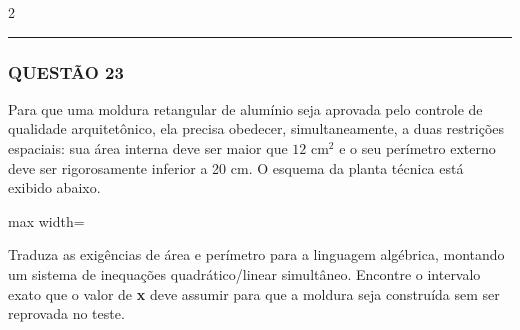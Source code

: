 \documentclass[11pt, a4paper]{article}
\begin{document}
\begin{multicols*}{2}
\vspace{0cm} \noindent\textcolor{CorLinha}{\rule{\linewidth}{0.5pt}} \vspace{-0.2cm}
\subsubsection*{QUESTÃO 23}
Para que uma moldura retangular de alumínio seja aprovada pelo controle de qualidade arquitetônico, ela precisa obedecer, simultaneamente, a duas restrições espaciais: sua área interna deve ser maior que $ 12 \text{ cm}^2 $ e o seu perímetro externo deve ser rigorosamente inferior a 20 cm. O esquema da planta técnica está exibido abaixo.

\begin{center}
\begin{adjustbox}{max width=\linewidth}
\end{adjustbox}
\end{center}

Traduza as exigências de área e perímetro para a linguagem algébrica, montando um sistema de inequações quadrático/linear simultâneo. Encontre o intervalo exato que o valor de \textbf{x} deve assumir para que a moldura seja construída sem ser reprovada no teste.


\end{multicols*}
\end{document}
